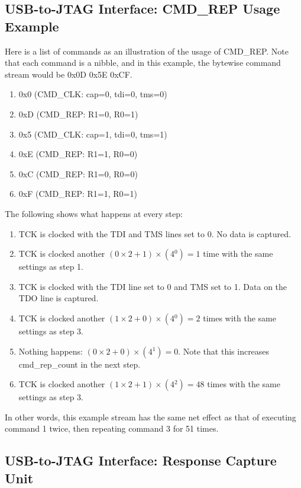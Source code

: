 \documentclass[main\_\_EN.tex]{subfiles}
\begin{document}
\subsection{USB-to-JTAG Interface: CMD\_REP Usage Example}

Here is a list of commands as an illustration of the usage of CMD\_REP. Note that each command is a nibble, and in this example, the bytewise command stream would be 0x0D 0x5E 0xCF.

\begin{enumerate}
\item 0x0 (CMD\_CLK: cap=0, tdi=0, tms=0)
\item 0xD (CMD\_REP: R1=0, R0=1)
\item 0x5 (CMD\_CLK: cap=1, tdi=0, tms=1)
\item 0xE (CMD\_REP: R1=1, R0=0)
\item 0xC (CMD\_REP: R1=0, R0=0)
\item 0xF (CMD\_REP: R1=1, R0=1)
\end{enumerate}

The following shows what happens at every step:

\begin{enumerate}
\item TCK is clocked with the TDI and TMS lines set to 0. No data is captured.
\item TCK is clocked another \((0\times2+1)\times(4{^0})=1\) time with the same settings as step 1.
\item TCK is clocked with the TDI line set to 0 and TMS set to 1. Data on the TDO line is captured.
\item TCK is clocked another \((1\times2+0)\times(4{^0})=2\) times with the same settings as step 3.
\item Nothing happens: \((0\times2+0)\times(4{^1})=0\). Note that this increases cmd\_rep\_count in the next step.
\item TCK is clocked another \((1\times2+1)\times(4{^2})=48\) times with the same settings as step 3.
\end{enumerate}

In other words, this example stream has the same net effect as that of executing command 1 twice, then repeating command 3 for 51 times.

\subsection{USB-to-JTAG Interface: Response Capture Unit}
\end{document}
